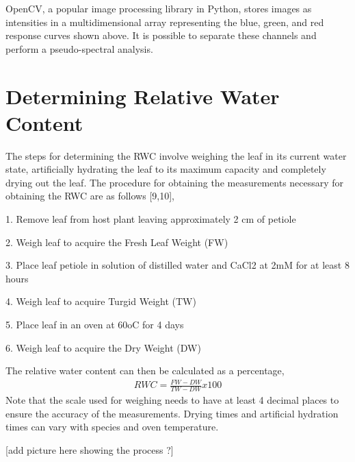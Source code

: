 OpenCV, a popular image processing library in Python, stores images as intensities in a multidimensional array representing the blue, green, and red response curves shown above.  It is possible to separate these channels and perform a pseudo-spectral analysis.

\section{Determining Relative Water Content}
The steps for determining the RWC involve weighing the leaf in its current water state, artificially hydrating the leaf to its maximum capacity and completely drying out the leaf.  The procedure for obtaining the measurements necessary for obtaining the RWC are as follows [9,10],

1.	Remove leaf from host plant leaving approximately 2 cm of petiole

2.	Weigh leaf to acquire the Fresh Leaf Weight (FW)

3.	Place leaf petiole in solution of distilled water and CaCl2 at 2mM for at least 8 hours

4.	Weigh leaf to acquire Turgid Weight (TW)

5.	Place leaf in an oven at 60oC for 4 days

6.	Weigh leaf to acquire the Dry Weight (DW)


The relative water content can then be calculated as a percentage,
%
\begin{align}
    RWC = \frac{FW - DW}{TW - DW} x 100%
\end{align}
%
Note that the scale used for weighing needs to have at least 4 decimal places to ensure the accuracy of the measurements. Drying times and artificial hydration times can vary with species and oven temperature.

[add picture here showing the process ?]
